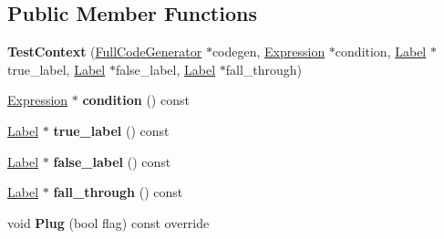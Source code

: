 \subsection*{Public Member Functions}
\begin{DoxyCompactItemize}
\item 
{\bfseries Test\+Context} (\hyperlink{classv8_1_1internal_1_1_full_code_generator}{Full\+Code\+Generator} $\ast$codegen, \hyperlink{classv8_1_1internal_1_1_expression}{Expression} $\ast$condition, \hyperlink{classv8_1_1internal_1_1_label}{Label} $\ast$true\+\_\+label, \hyperlink{classv8_1_1internal_1_1_label}{Label} $\ast$false\+\_\+label, \hyperlink{classv8_1_1internal_1_1_label}{Label} $\ast$fall\+\_\+through)\hypertarget{classv8_1_1internal_1_1_full_code_generator_1_1_test_context_aec0d5c12abb2f48bb49c7348a21ba480}{}\label{classv8_1_1internal_1_1_full_code_generator_1_1_test_context_aec0d5c12abb2f48bb49c7348a21ba480}

\item 
\hyperlink{classv8_1_1internal_1_1_expression}{Expression} $\ast$ {\bfseries condition} () const \hypertarget{classv8_1_1internal_1_1_full_code_generator_1_1_test_context_a82b6063a3cbb8dd7d8d6e05767eda347}{}\label{classv8_1_1internal_1_1_full_code_generator_1_1_test_context_a82b6063a3cbb8dd7d8d6e05767eda347}

\item 
\hyperlink{classv8_1_1internal_1_1_label}{Label} $\ast$ {\bfseries true\+\_\+label} () const \hypertarget{classv8_1_1internal_1_1_full_code_generator_1_1_test_context_aec80c433d331e70215c120fe1c96452b}{}\label{classv8_1_1internal_1_1_full_code_generator_1_1_test_context_aec80c433d331e70215c120fe1c96452b}

\item 
\hyperlink{classv8_1_1internal_1_1_label}{Label} $\ast$ {\bfseries false\+\_\+label} () const \hypertarget{classv8_1_1internal_1_1_full_code_generator_1_1_test_context_a5dadeb33894432077cf2f4b15ecf2edf}{}\label{classv8_1_1internal_1_1_full_code_generator_1_1_test_context_a5dadeb33894432077cf2f4b15ecf2edf}

\item 
\hyperlink{classv8_1_1internal_1_1_label}{Label} $\ast$ {\bfseries fall\+\_\+through} () const \hypertarget{classv8_1_1internal_1_1_full_code_generator_1_1_test_context_ab16b7bc38d767d3a6050d478c345d571}{}\label{classv8_1_1internal_1_1_full_code_generator_1_1_test_context_ab16b7bc38d767d3a6050d478c345d571}

\item 
void {\bfseries Plug} (bool flag) const  override\hypertarget{classv8_1_1internal_1_1_full_code_generator_1_1_test_context_a3059e4ff6c5ccf01b6a196ca45294552}{}\label{classv8_1_1internal_1_1_full_code_generator_1_1_test_context_a3059e4ff6c5ccf01b6a196ca45294552}


\end{DoxyCompactItemize}
